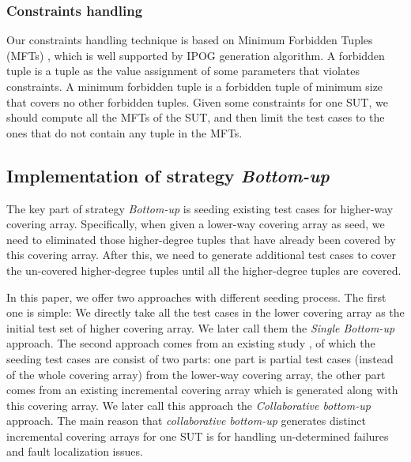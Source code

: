 \documentclass[conference]{IEEEtran}
\theoremstyle{definition}
\begin{document}
\subsubsection{Constraints handling}
Our constraints handling technique is based on Minimum Forbidden Tuples (MFTs) \cite{yu2014combinatorial,yu2015constraint}, which is well supported by IPOG generation algorithm. A forbidden tuple is a tuple as the value assignment of some parameters that violates constraints. A minimum forbidden tuple is a forbidden tuple of minimum size that covers no other forbidden tuples. Given some constraints for one SUT, we should compute all the MFTs of the SUT, and then limit the test cases to the ones that do not contain any tuple in the MFTs.

\subsection{Implementation of strategy \emph{Bottom-up}}

The key part of strategy \emph{Bottom-up} is seeding existing test cases for higher-way covering array. Specifically, when given a lower-way covering array as seed, we need to eliminated those higher-degree tuples that have already been covered by this covering array. After this, we need to generate additional test cases to cover the un-covered higher-degree tuples until all the higher-degree tuples are covered.

In this paper, we offer two approaches with different seeding process. The first one is simple: We directly take all the test cases in the lower covering array as the initial test set of higher covering array. We later call them the \emph{Single Bottom-up} approach. The second approach comes from an existing study \cite{fouche2009incremental}, of which the seeding test cases are consist of two parts: one part is partial test cases (instead of the whole covering array) from the lower-way covering array, the other part comes from an existing incremental covering array which is generated along with this covering array. We later call this approach the \emph{Collaborative bottom-up} approach. The main reason that \emph{collaborative bottom-up} generates distinct incremental covering arrays for one SUT is for handling un-determined failures and fault localization issues.
\end{document}
